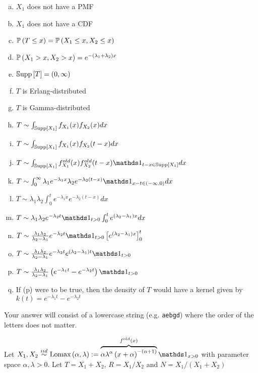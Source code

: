 \documentclass[12pt,landscape]{article}
\newcommand{\instr}{\small Your answer will consist of a lowercase string (e.g. \texttt{aebgd}) where the order of the letters does not matter. \normalsize}
\begin{document}
\begin{enumerate}[(a)]
\item $X_1$ does not have a PMF
\item $X_1$ does not have a CDF
\item $\mathbb{P}\left(T \leq x\right) = \mathbb{P}\left(X_1 \leq x, X_2 \leq x\right)$
\item $\mathbb{P}\left(X_1 > x, X_2 > x\right) = e^{-(\lambda_1 + \lambda_2)x}$
\item $\mathbb{S}\text{upp}\left[T\right] = (0, \infty)$
\item $T$ is Erlang-distributed
\item $T$ is Gamma-distributed
\item $T \sim \int_{\mathbb{S}\text{upp}\left[X_1\right]} f_{X_1}(x) f_{X_2}(x)dx$
\item $T \sim \int_{\mathbb{S}\text{upp}\left[X_1\right]} f_{X_1}(x) f_{X_2}(t-x)dx$
\item $T \sim \int_{\support{X_1}} f_{X_1}^{old}(x) f_{X_2}^{old}(t-x) \indic{t-x \in \support{X_1}} dx$
\item $T \sim \int_{0}^\infty \lambda_1 e^{-\lambda_1 x} \lambda_2 e^{-\lambda_2 (t-x)} \indic{x-t \in (-\infty, 0)} dx$
\item $T \sim \lambda_1 \lambda_2 \int_{0}^t e^{-\lambda_1 x} e^{-\lambda_2 (t-x)} dx$
\item $T \sim \lambda_1 \lambda_2 e^{-\lambda_2 t} \indic{t > 0} \int_{0}^t e^{(\lambda_2 - \lambda_1)x} dx$
\item $T \sim \frac{\lambda_1 \lambda_2}{\lambda_2 - \lambda_1} e^{-\lambda_2 t} \indic{t > 0} \bracks{e^{(\lambda_2 - \lambda_1)x}}_0^t$
\item $T \sim \frac{\lambda_1 \lambda_2}{\lambda_2 - \lambda_1} e^{-\lambda_2 t} e^{(\lambda_2 - \lambda_1)t} \indic{t > 0}$
\item $T \sim \frac{\lambda_1 \lambda_2}{\lambda_2 - \lambda_1} \parens{e^{-\lambda_1 t} - e^{-\lambda_2 t}} \indic{t > 0}$
\item If (p) were to be true, then the density of $T$ would have a kernel given by $k(t) = e^{-\lambda_1 t} - e^{-\lambda_2 t}$
\end{enumerate}
\eenum\instr\pagebreak


\problem{} Let $X_1, X_2 \iid \text{Lomax}\parens{\alpha, \lambda} :=\overbrace{\alpha\lambda^\alpha \tothepow{x + \alpha}{-(\alpha + 1)}}^{f^{old}(x)} \indic{x > 0}$ with parameter space $\alpha, \lambda > 0$. Let $T = X_1 + X_2$, $R = X_1 / X_2$ and $N = X_1 / (X_1 +  X_2)$

\vspace{-0.2cm}\benum{} 
\end{document}
